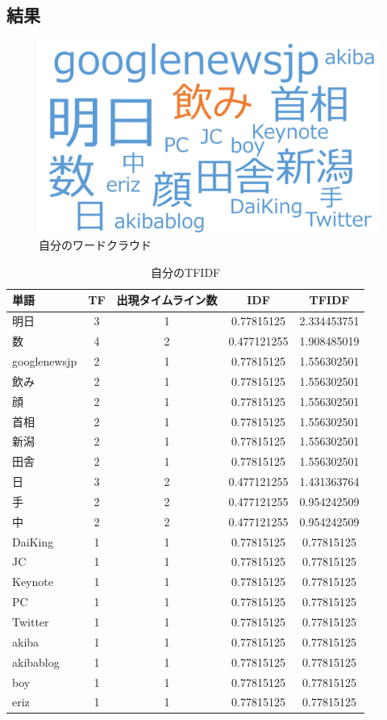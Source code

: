 \subsection{結果}

\begin{figure}[H]
\centering
\includegraphics[width=13cm]{yoshino_cloud.png}
\caption{自分のワードクラウド}\label{yoshinocloud}
\end{figure}

\begin{table}[H]
	\centering
	\caption{自分のTFIDF}
	\begin{tabular}{l|c|c|c|c}
		単語 & TF & 出現タイムライン数 & IDF & TFIDF \\ \hline
		明日 & 3 & 1 & 0.77815125 & 2.334453751 \\
		数 & 4 & 2 & 0.477121255 & 1.908485019 \\
		googlenewsjp & 2 & 1 & 0.77815125 & 1.556302501 \\
		飲み & 2 & 1 & 0.77815125 & 1.556302501 \\
		顔 & 2 & 1 & 0.77815125 & 1.556302501 \\
		首相 & 2 & 1 & 0.77815125 & 1.556302501 \\
		新潟 & 2 & 1 & 0.77815125 & 1.556302501 \\
		田舎 & 2 & 1 & 0.77815125 & 1.556302501 \\
		日 & 3 & 2 & 0.477121255 & 1.431363764 \\
		手 & 2 & 2 & 0.477121255 & 0.954242509 \\
		中 & 2 & 2 & 0.477121255 & 0.954242509 \\
		DaiKing & 1 & 1 & 0.77815125 & 0.77815125 \\
		JC & 1 & 1 & 0.77815125 & 0.77815125 \\
		Keynote & 1 & 1 & 0.77815125 & 0.77815125 \\
		PC & 1 & 1 & 0.77815125 & 0.77815125 \\
		Twitter & 1 & 1 & 0.77815125 & 0.77815125 \\
		akiba & 1 & 1 & 0.77815125 & 0.77815125 \\
		akibablog & 1 & 1 & 0.77815125 & 0.77815125 \\
		boy & 1 & 1 & 0.77815125 & 0.77815125 \\
		eriz & 1 & 1 & 0.77815125 & 0.77815125
	\end{tabular}
\end{table}

